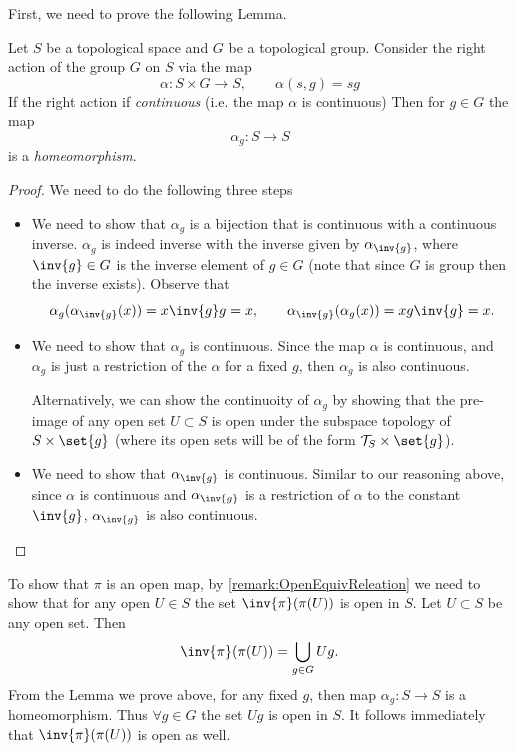 \begin{solution}
	First, we need to prove the following Lemma.
	\begin{lemma}
		\label{lemma:contGroupActionOpenProjection}
		Let $ S $ be a topological space and $ G $ be a topological group. Consider the right action of the group $ G $ on $ S $ via the map 
		\[ \alpha : S \times G \to S, \qquad \alpha(s,g) = sg \]
		If the right action if \emph{continuous} (i.e. the map $ \alpha $ is continuous) Then for $ g \in G $ the map
		\[ \alpha_g: S \to S \]
		is a \emph{homeomorphism}.
	\end{lemma}
	\begin{proof}
		We need to do the following three steps
		\begin{itemize}
			\item We need to show that $ \alpha_g $ is a bijection that is continuous with a continuous inverse. $ \alpha_g $ is indeed inverse with the inverse given by $ \alpha_{\inv{g}} $, where $ \inv{g} \in G$ is the inverse element of $ g \in G $ (note that since $ G $ is group then the inverse exists). Observe that 
			\[ \alpha_g(\alpha_{\inv{g}}(x)) = x\inv{g}g = x, \qquad \alpha_{\inv{g}}(\alpha_g(x)) = xg\inv{g} = x. \]
			
			\item We need to show that $ \alpha_g $ is continuous. Since the map  $ \alpha $ is continuous, and $ \alpha_g $ is just a restriction of the $ \alpha $ for a fixed $ g $, then $ \alpha_g $ is also continuous. 
			
			Alternatively, we can show the continuoity of $ \alpha_g $ by showing that the pre-image of any open set $ U \subset S $ is open under the subspace topology of $ S \times \set{g}$ (where its open sets will be of the form $ \mathcal{T}_S\times\set{g} $).
			
			\item We need to show that $ \alpha_\inv{g} $ is continuous. Similar to our reasoning above, since $ \alpha $ is continuous and $ \alpha_\inv{g} $ is a restriction of $ \alpha $ to the constant $ \inv{g} $, $ \alpha_\inv{g} $ is also continuous.
		\end{itemize}	
	\end{proof}
	To show that $ \pi $ is an open map, by \autoref{remark:OpenEquivReleation} we need to show that for any open $ U \in S $ the set $ \inv{\pi}(\pi(U)) $ is open in $ S $. Let $ U \subset S $ be any open set. Then 
	\[ \inv{\pi}(\pi(U)) = \bigcup_{g \in G} Ug. \]
	From the Lemma we prove above, for any fixed $ g $, then map $ \alpha_g: S\to S $ is a homeomorphism. Thus $ \forall g\in G $ the set $ Ug $ is open in $ S $. It follows immediately that $ \inv{\pi}(\pi(U)) $ is open as well.
 \end{solution}
 
